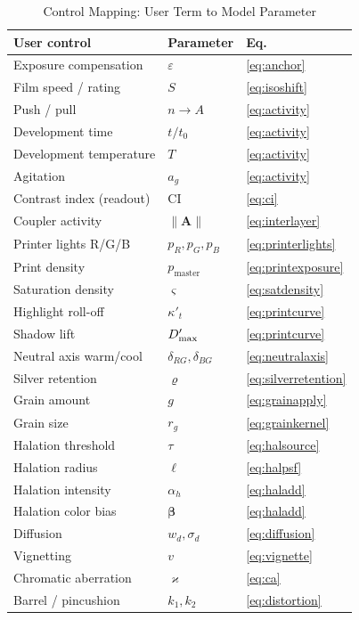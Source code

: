 \begin{table}[htbp]
\caption{Control Mapping: User Term to Model Parameter}
\label{tab:controlmap}
\begin{center}
\renewcommand{\arraystretch}{1.12}
\begin{tabularx}{\columnwidth}{@{}>{\raggedright\arraybackslash}X l l@{}}
\toprule
\textbf{User control} & \textbf{Parameter} & \textbf{Eq.} \\
\midrule
Exposure compensation & $\varepsilon$ & \eqref{eq:anchor} \\
Film speed / rating & $S$ & \eqref{eq:isoshift} \\
Push / pull & $n \to A$ & \eqref{eq:activity} \\
Development time & $t/t_0$ & \eqref{eq:activity} \\
Development temperature & $T$ & \eqref{eq:activity} \\
Agitation & $a_g$ & \eqref{eq:activity} \\
Contrast index (readout) & CI & \eqref{eq:ci} \\
Coupler activity & $\|\mathbf{A}\|$ & \eqref{eq:interlayer} \\
Printer lights R/G/B & $p_R, p_G, p_B$ & \eqref{eq:printerlights} \\
Print density & $p_{\mathrm{master}}$ & \eqref{eq:printexposure} \\
Saturation density & $\varsigma$ & \eqref{eq:satdensity} \\
Highlight roll-off & $\kappa'_t$ & \eqref{eq:printcurve} \\
Shadow lift & $D_{\max}'$ & \eqref{eq:printcurve} \\
Neutral axis warm/cool & $\delta_{RG}, \delta_{BG}$ & \eqref{eq:neutralaxis} \\
Silver retention & $\varrho$ & \eqref{eq:silverretention} \\
Grain amount & $g$ & \eqref{eq:grainapply} \\
Grain size & $r_g$ & \eqref{eq:grainkernel} \\
Halation threshold & $\tau$ & \eqref{eq:halsource} \\
Halation radius & $\ell$ & \eqref{eq:halpsf} \\
Halation intensity & $\alpha_h$ & \eqref{eq:haladd} \\
Halation color bias & $\boldsymbol{\beta}$ & \eqref{eq:haladd} \\
Diffusion & $w_d, \sigma_d$ & \eqref{eq:diffusion} \\
Vignetting & $v$ & \eqref{eq:vignette} \\
Chromatic aberration & $\varkappa$ & \eqref{eq:ca} \\
Barrel / pincushion & $k_1, k_2$ & \eqref{eq:distortion} \\
\bottomrule
\end{tabularx}
\end{center}
\end{table}
